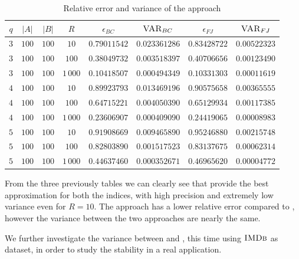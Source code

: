 \begin{table}[h]
	\centering
	\begin{tabular}{|c|c|c|c|c|c|c|c|}
		\hline
		$q$ & $|A|$ & $|B|$ & $R$      & $\epsilon_{BC}$ & $\textsc{VAR}_{BC}$ & $\epsilon_{FJ}$ & $\textsc{VAR}_{FJ}$ \\ \hline \hline
		$3$ & $100$ & $100$ & $10$     & $0.79011542$    & $0.023361286$       & $0.83428722$    & $0.00522323$        \\ \hline
		$3$ & $100$ & $100$ & $100$    & $0.38049732$    & $0.003518397$       & $0.40706656$    & $0.00123490$        \\ \hline
		$3$ & $100$ & $100$ & $1\,000$ & $0.10418507$    & $0.000494349$       & $0.10331303$    & $0.00011619$        \\ \hline \hline
		$4$ & $100$ & $100$ & $10$     & $0.89923793$    & $0.013469196$       & $0.90575658$    & $0.00365555$        \\ \hline
		$4$ & $100$ & $100$ & $100$    & $0.64715221$    & $0.004050390$       & $0.65129934$    & $0.00117385$        \\ \hline
		$4$ & $100$ & $100$ & $1\,000$ & $0.23606907$    & $0.000409090$       & $0.24419065$    & $0.00008983$        \\ \hline \hline
		$5$ & $100$ & $100$ & $10$     & $0.91908669$    & $0.009465890$       & $0.95246880$    & $0.00215748$        \\ \hline
		$5$ & $100$ & $100$ & $100$    & $0.82803890$    & $0.001517523$       & $0.83137675$    & $0.00062314$        \\ \hline
		$5$ & $100$ & $100$ & $1\,000$ & $0.44637460$    & $0.000352671$       & $0.46965620$    & $0.00004772$        \\ \hline
	\end{tabular}
	\caption{Relative error and variance of the \base approach}	
\end{table}

\clearpage

From the three previously tables we can clearly see that \fcount provide the best approximation for both the indices, 
with high precision and extremely low variance even for $R=10$. 
The \fsamp approach has a lower relative error compared to \base, however the variance between the two approaches are nearly the same.\medskip

We further investigate the variance between \fsamp and \base, this time using $\textsc{IMDb}$ as dataset,
in order to study the stability in a real application.

